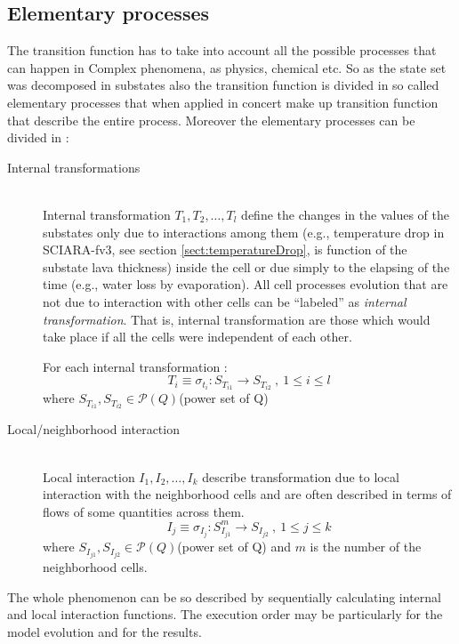 \subsection{Elementary processes}\label{elementaryProcesses}
The transition function has to take into account all the possible processes that
can happen in  Complex phenomena, as physics, chemical etc. So as the state
set was decomposed in substates also the transition function is divided in so
called elementary processes that when applied in concert make up 
transition function that describe the entire process.
Moreover the elementary processes can be divided in :
\begin{description}
  \item[Internal transformations] \hfill \\
  Internal transformation \(T_1,T_2,\ldots,T_l\) define the changes in the
  values of the substates only due to interactions among them (e.g., temperature
  drop in SCIARA-fv3, see section \ref{sect:temperatureDrop}, is function of
  the substate lava thickness) inside the cell or due simply to the elapsing of
  the time (e.g., water loss by evaporation). All cell processes evolution that
  are not due to interaction with other cells can be ``labeled'' as
  \emph{internal transformation}. That is, internal transformation are those
  which would take place if all the cells were independent of each other.

For each internal transformation :
\[ 
  T_i \equiv \sigma_{t_i} \colon  S_{T_{i1}}\rightarrow S_{T_{i2}} \:,\: 1 \leq
  i \leq l
\] 
  where \begin{math}S_{T_{i1}},S_{T_{i2}} \in \mathcal{P}(Q) \end{math}(power
  set of Q) 
  \item[Local/neighborhood interaction] \hfill \\
  Local interaction \(I_1,I_2,\ldots,I_k\) describe transformation due to local
  interaction with the neighborhood cells and are often described in terms of
  flows of some quantities across them.
\[
  I_j \equiv \sigma_{I_j} \colon  S^m_{I_{j1}} \rightarrow S_{I_{j2}} \:,\:
  1 \leq j \leq k
\] 
  where \begin{math}S_{I_{j1}},S_{I_{j2}} \in \mathcal{P}(Q) \end{math}(power
  set of Q) and \(m\) is the number of the neighborhood cells.
\end{description}

The whole phenomenon can be so described by sequentially calculating internal
and local interaction functions. The execution order may be
particularly  for the model evolution and for the results\cite{Ruxton1996}.

